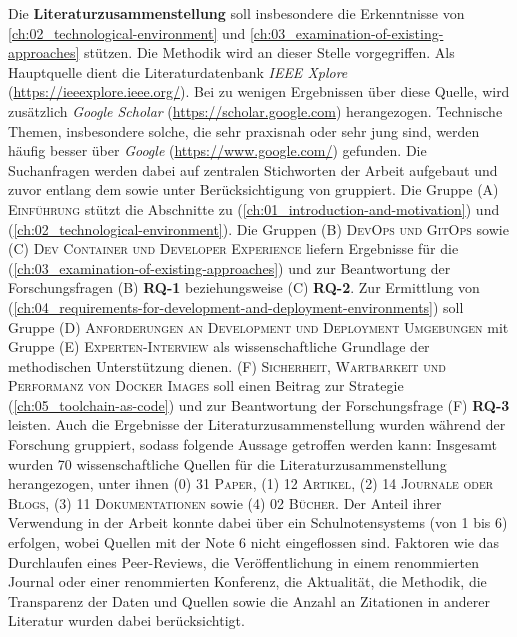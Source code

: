 Die \textbf{Literaturzusammenstellung} soll insbesondere die Erkenntnisse von \autoref{ch:02_technological-environment} und \autoref{ch:03_examination-of-existing-approaches} stützen. Die Methodik wird an dieser Stelle vorgegriffen. Als Hauptquelle dient die Literaturdatenbank \textit{IEEE Xplore} (\url{https://ieeexplore.ieee.org/}). Bei zu wenigen Ergebnissen über diese Quelle, wird zusätzlich \textit{Google Scholar} (\url{https://scholar.google.com}) herangezogen. Technische Themen, insbesondere solche, die sehr praxisnah oder sehr jung sind, werden häufig besser über \textit{Google} (\url{https://www.google.com/}) gefunden. Die Suchanfragen werden dabei auf zentralen Stichworten der Arbeit aufgebaut und zuvor entlang dem  sowie unter Berücksichtigung von  gruppiert. Die Gruppe \textsc{(A) Einführung} stützt die Abschnitte zu  (\autoref{ch:01_introduction-and-motivation}) und  (\autoref{ch:02_technological-environment}). Die Gruppen \textsc{(B) DevOps und GitOps} sowie \textsc{(C) Dev Container und Developer Experience} liefern Ergebnisse für die  (\autoref{ch:03_examination-of-existing-approaches}) und zur Beantwortung der Forschungsfragen \textsc{(B)} \textbf{RQ-1} beziehungsweise \textsc{(C)} \textbf{RQ-2}. Zur Ermittlung von  (\autoref{ch:04_requirements-for-development-and-deployment-environments}) soll Gruppe \textsc{(D) Anforderungen an Development und Deployment Umgebungen} mit Gruppe \textsc{(E) Experten-Interview} als wissenschaftliche Grundlage der methodischen Unterstützung dienen. \textsc{(F) Sicherheit, Wartbarkeit und Performanz von Docker Images} soll einen Beitrag zur  Strategie (\autoref{ch:05_toolchain-as-code}) und zur Beantwortung der Forschungsfrage \textsc{(F)} \textbf{RQ-3} leisten. Auch die Ergebnisse der Literaturzusammenstellung wurden während der Forschung gruppiert, sodass folgende Aussage getroffen werden kann: Insgesamt wurden 70 wissenschaftliche Quellen für die Literaturzusammenstellung herangezogen, unter ihnen \textsc{(0)} 31 \textsc{Paper}, \textsc{(1)} 12 \textsc{Artikel}, \textsc{(2)} 14 \textsc{Journale oder Blogs}, \textsc{(3)} 11 \textsc{Dokumentationen} sowie \textsc{(4)} 02 \textsc{Bücher}. Der Anteil ihrer Verwendung in der Arbeit konnte dabei über ein Schulnotensystems (von 1 bis 6) erfolgen, wobei Quellen mit der Note 6 nicht eingeflossen sind. Faktoren wie das Durchlaufen eines Peer-Reviews, die Veröffentlichung in einem renommierten Journal oder einer renommierten Konferenz, die Aktualität, die Methodik, die Transparenz der Daten und Quellen sowie die Anzahl an Zitationen in anderer Literatur wurden dabei berücksichtigt.

